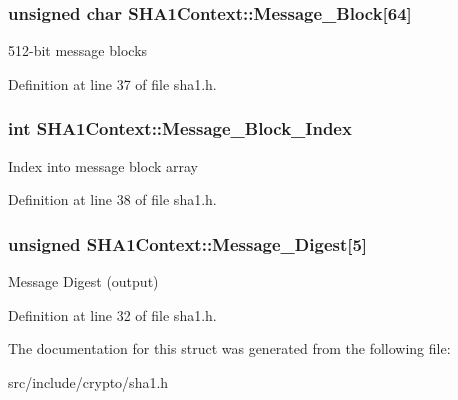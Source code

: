 \subsubsection[{Message\+\_\+\+Block}]{\setlength{\rightskip}{0pt plus 5cm}unsigned char S\+H\+A1\+Context\+::\+Message\+\_\+\+Block\mbox{[}64\mbox{]}}\label{structSHA1Context_ac29c71f56046f207c9c0f7bcc0bd8a2e}
512-\/bit message blocks 

Definition at line 37 of file sha1.\+h.

\hypertarget{structSHA1Context_a833f19a2e09ac6615dc77525f336c598}{}
\subsubsection[{Message\+\_\+\+Block\+\_\+\+Index}]{\setlength{\rightskip}{0pt plus 5cm}int S\+H\+A1\+Context\+::\+Message\+\_\+\+Block\+\_\+\+Index}\label{structSHA1Context_a833f19a2e09ac6615dc77525f336c598}
Index into message block array 

Definition at line 38 of file sha1.\+h.

\hypertarget{structSHA1Context_a33ef73a6e4eb34e1e251662c18e36ad3}{}
\subsubsection[{Message\+\_\+\+Digest}]{\setlength{\rightskip}{0pt plus 5cm}unsigned S\+H\+A1\+Context\+::\+Message\+\_\+\+Digest\mbox{[}5\mbox{]}}\label{structSHA1Context_a33ef73a6e4eb34e1e251662c18e36ad3}
Message Digest (output) 

Definition at line 32 of file sha1.\+h.



The documentation for this struct was generated from the following file\+:\begin{DoxyCompactItemize}
\item 
src/include/crypto/sha1.\+h\end{DoxyCompactItemize}
